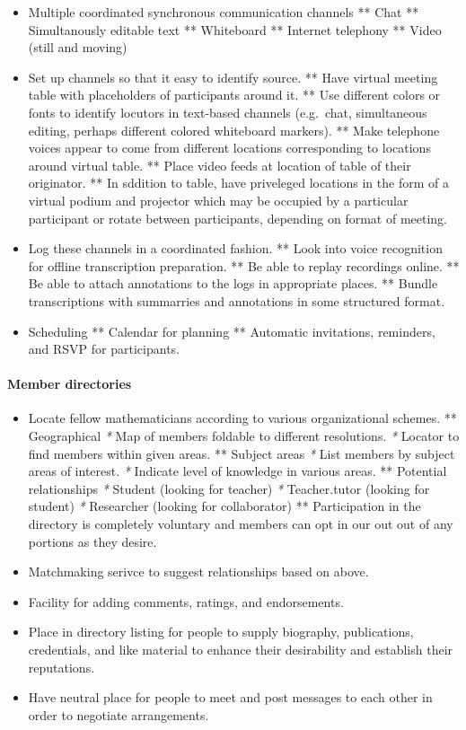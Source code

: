 \begin{itemize}
\item
  Multiple coordinated synchronous communication channels ** Chat **
  Simultanously editable text ** Whiteboard ** Internet telephony **
  Video (still and moving)
\item
  Set up channels so that it easy to identify source. ** Have virtual
  meeting table with placeholders of participants around it. ** Use
  different colors or fonts to identify locutors in text-based channels
  (e.g.~chat, simultaneous editing, perhaps different colored whiteboard
  markers). ** Make telephone voices appear to come from different
  locations corresponding to locations around virtual table. ** Place
  video feeds at location of table of their originator. ** In sddition
  to table, have priveleged locations in the form of a virtual podium
  and projector which may be occupied by a particular participant or
  rotate between participants, depending on format of meeting.
\item
  Log these channels in a coordinated fashion. ** Look into voice
  recognition for offline transcription preparation. ** Be able to
  replay recordings online. ** Be able to attach annotations to the logs
  in appropriate places. ** Bundle transcriptions with summarries and
  annotations in some structured format.
\item
  Scheduling ** Calendar for planning ** Automatic invitations,
  reminders, and RSVP for participants.
\end{itemize}

\paragraph{Member directories}

\begin{itemize}
\item
  Locate fellow mathematicians according to various organizational
  schemes. ** Geographical \emph{*} Map of members foldable to different
  resolutions. \emph{*} Locator to find members within given areas. **
  Subject areas \emph{*} List members by subject areas of interest.
  \emph{*} Indicate level of knowledge in various areas. ** Potential
  relationships \emph{*} Student (looking for teacher) \emph{*}
  Teacher.tutor (looking for student) \emph{*} Researcher (looking for
  collaborator) ** Participation in the directory is completely
  voluntary and members can opt in our out out of any portions as they
  desire.
\item
  Matchmaking serivce to suggest relationships based on above.
\item
  Facility for adding comments, ratings, and endorsements.
\item
  Place in directory listing for people to supply biography,
  publications, credentials, and like material to enhance their
  desirability and establish their reputations.
\item
  Have neutral place for people to meet and post messages to each other
  in order to negotiate arrangements.
\end{itemize}

